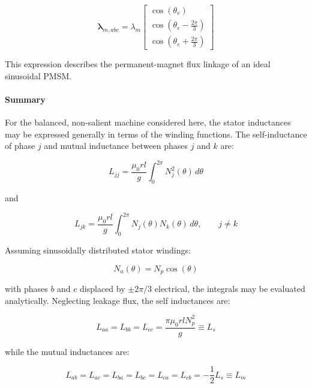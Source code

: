 \documentclass{article}
\begin{document}
\begin{equation}
\boldsymbol{\lambda}_{m,abc}
=
\lambda_m
\begin{bmatrix}
\cos(\theta_e) \\[4pt]
\cos\left(\theta_e-\frac{2\pi}{3}\right) \\[4pt]
\cos\left(\theta_e+\frac{2\pi}{3}\right)
\end{bmatrix}
\end{equation}

This expression describes the permanent-magnet flux linkage of an ideal sinusoidal PMSM.


\paragraph{Summary}

For the balanced, non-salient machine considered here, the stator inductances may be expressed generally in terms of the winding functions. The self-inductance of phase $j$ and mutual inductance between phases $j$ and $k$ are:

\begin{equation}
    L_{jj} = \frac{\mu_0 r l}{g} \int_0^{2\pi} N_j^2(\theta)\,d\theta
\end{equation}

and

\begin{equation}
    L_{jk} = \frac{\mu_0 r l}{g} \int_0^{2\pi} N_j(\theta)N_k(\theta)\,d\theta, \qquad j \neq k
\end{equation}

Assuming sinusoidally distributed stator windings:

\begin{equation}
    N_a(\theta)=N_p\cos(\theta)
\end{equation}

with phases $b$ and $c$ displaced by $\pm 2\pi/3$ electrical, the integrals may be evaluated analytically. Neglecting leakage flux, the self inductances are:

\begin{equation}
    L_{aa}=L_{bb}=L_{cc} = \frac{\pi\mu_0 r l N_p^2}{g} \equiv L_s
\end{equation}

while the mutual inductances are:

\begin{equation}
    L_{ab}=L_{ac}=L_{ba}=L_{bc}=L_{ca}=L_{cb} = -\frac{1}{2}L_s \equiv L_m
\end{equation}
\end{document}
